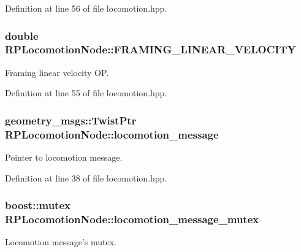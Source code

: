 \-Definition at line 56 of file locomotion.\-hpp.

\hypertarget{class_r_p_locomotion_node_a35b3c79ea9c02d5a8d7c01148187a95f}{
\subsubsection[{\-F\-R\-A\-M\-I\-N\-G\-\_\-\-L\-I\-N\-E\-A\-R\-\_\-\-V\-E\-L\-O\-C\-I\-T\-Y}]{\setlength{\rightskip}{0pt plus 5cm}double {\bf \-R\-P\-Locomotion\-Node\-::\-F\-R\-A\-M\-I\-N\-G\-\_\-\-L\-I\-N\-E\-A\-R\-\_\-\-V\-E\-L\-O\-C\-I\-T\-Y}}}\label{class_r_p_locomotion_node_a35b3c79ea9c02d5a8d7c01148187a95f}
\-Framing linear velocity \-O\-P. 

\-Definition at line 55 of file locomotion.\-hpp.

\hypertarget{class_r_p_locomotion_node_ac9668ec315e5c8b9b45e6c1ee9cd18ee}{
\subsubsection[{locomotion\-\_\-message}]{\setlength{\rightskip}{0pt plus 5cm}geometry\-\_\-msgs\-::\-Twist\-Ptr {\bf \-R\-P\-Locomotion\-Node\-::locomotion\-\_\-message}}}\label{class_r_p_locomotion_node_ac9668ec315e5c8b9b45e6c1ee9cd18ee}
\-Pointer to locomotion message. 

\-Definition at line 38 of file locomotion.\-hpp.

\hypertarget{class_r_p_locomotion_node_aa852cb0599e4ad545d01339479d20121}{
\subsubsection[{locomotion\-\_\-message\-\_\-mutex}]{\setlength{\rightskip}{0pt plus 5cm}boost\-::mutex {\bf \-R\-P\-Locomotion\-Node\-::locomotion\-\_\-message\-\_\-mutex}}}\label{class_r_p_locomotion_node_aa852cb0599e4ad545d01339479d20121}
\-Locomotion message's mutex. 

